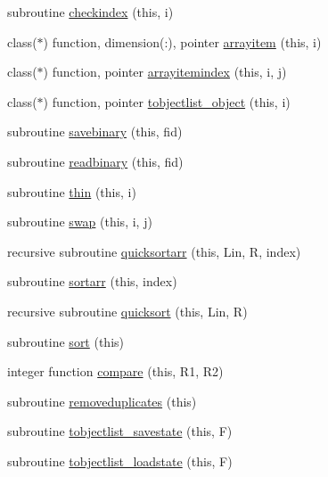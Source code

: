 \begin{DoxyCompactItemize}
\item 
subroutine \mbox{\hyperlink{namespaceobjectlists_aff0608d072ab891a55072d2afde0b978}{checkindex}} (this, i)
\item 
class($\ast$) function, dimension(\+:), pointer \mbox{\hyperlink{namespaceobjectlists_a72ee9292ce07a71798b7b6ac5b3cb6c3}{arrayitem}} (this, i)
\item 
class($\ast$) function, pointer \mbox{\hyperlink{namespaceobjectlists_aef8a1d27db060a7e7289e5ee3849ce21}{arrayitemindex}} (this, i, j)
\item 
class($\ast$) function, pointer \mbox{\hyperlink{namespaceobjectlists_a9a1de7415648fec93d3d27e8b3ad053f}{tobjectlist\+\_\+object}} (this, i)
\item 
subroutine \mbox{\hyperlink{namespaceobjectlists_abbc4a249efcc68f87936eb7e93ecffaf}{savebinary}} (this, fid)
\item 
subroutine \mbox{\hyperlink{namespaceobjectlists_a68cfe6fa523fb21df53a6f58e5fb498e}{readbinary}} (this, fid)
\item 
subroutine \mbox{\hyperlink{namespaceobjectlists_a48d7726bdf69ff2b7cb84d89d12af19d}{thin}} (this, i)
\item 
subroutine \mbox{\hyperlink{namespaceobjectlists_afbb87b678b2aa36260efbc57bb11a45b}{swap}} (this, i, j)
\item 
recursive subroutine \mbox{\hyperlink{namespaceobjectlists_a663520be1986351d7c16a9fccb40b6e8}{quicksortarr}} (this, Lin, R, index)
\item 
subroutine \mbox{\hyperlink{namespaceobjectlists_af5166a7a14ff75eca5eda21a454fe2a2}{sortarr}} (this, index)
\item 
recursive subroutine \mbox{\hyperlink{namespaceobjectlists_a3000970aec60eac0c74b465332a4fca2}{quicksort}} (this, Lin, R)
\item 
subroutine \mbox{\hyperlink{namespaceobjectlists_ab62cea139392ebee550346a3f36a8448}{sort}} (this)
\item 
integer function \mbox{\hyperlink{namespaceobjectlists_a05b2014389dbbc09da541c24912141f8}{compare}} (this, R1, R2)
\item 
subroutine \mbox{\hyperlink{namespaceobjectlists_af660367ba45ff04c784f5ea3c01560ea}{removeduplicates}} (this)
\item 
subroutine \mbox{\hyperlink{namespaceobjectlists_a5bd3b270e5c0f08c54a0a72838aa7b95}{tobjectlist\+\_\+savestate}} (this, F)
\item 
subroutine \mbox{\hyperlink{namespaceobjectlists_a198a78c4eeeccbbfa31216f589beda86}{tobjectlist\+\_\+loadstate}} (this, F)

\end{DoxyCompactItemize}
